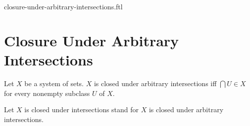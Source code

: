 \documentclass{naproche-library}
\begin{document}
\begin{smodule}{closure-under-arbitrary-intersections.ftl}

  \section*{Closure Under Arbitrary Intersections}

  \begin{definition}[forthel,id=FOUNDATIONS_14_2369621166391296,printid]
    Let $X$ be a system of sets.
    $X$ is closed under arbitrary intersections iff $\bigcap U \in X$ for every nonempty subclass $U$ of $X$.

    Let $X$ is closed under intersections stand for $X$ is closed under arbitrary intersections.
  \end{definition}
\end{smodule}
\end{document}
